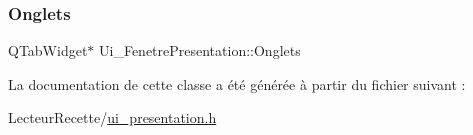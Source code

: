 \mbox{\label{class_ui___fenetre_presentation_a5ada401c3f50deda8794ad915e047707}} 
\subsubsection{\texorpdfstring{Onglets}{Onglets}}
{\footnotesize\ttfamily Q\+Tab\+Widget$\ast$ Ui\+\_\+\+Fenetre\+Presentation\+::\+Onglets}



La documentation de cette classe a été générée à partir du fichier suivant \+:\begin{DoxyCompactItemize}
\item 
Lecteur\+Recette/\hyperlink{ui__presentation_8h}{ui\+\_\+presentation.\+h}\end{DoxyCompactItemize}
